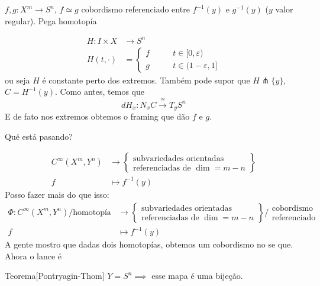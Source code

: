 \(f,g: X^m \to S^n\), \(f \simeq g\) cobordismo referenciado entre \(f^{-1}(y)\) e \(g^{-1}(y)\) (\(y\) valor regular). Pega homotopía

 \begin{align*}
	H: I\times X &\longrightarrow S^n \\
	H(t,\cdot ) &=\begin{cases}
		f\qquad & t \in [0, \varepsilon) \\
		g\qquad &t \in (1-\varepsilon,1]
	\end{cases}
\end{align*}
ou seja \(H\) é constante perto dos extremos. Também pode supor que \(H \pitchfork  \{ y\}\), \(C=H^{-1}(y)\). Como antes, temos que
\[d H_x: N_x C \xrightarrow{\cong}T_yS^n\]
E de fato nos extremos obtemos o framing que dão \(f\) e \(g\).

Qué está pasando?

\begin{align*}
	 C^\infty(X^m,Y^n) &\longrightarrow \left\{\substack{\text{subvariedades orientadas}  \\ \text{referenciadas de \(\dim=m-n\)} } \right\} \\
	f &\longmapsto f^{-1}(y)
\end{align*}
Posso fazer mais do que isso:
\begin{align*}
	\Phi: C^\infty(X^m,Y^n)\Big/\text{homotopía}  &\longrightarrow \left\{\substack{\text{subvariedades orientadas}  \\ \text{referenciadas de \(\dim=m-n\)} } \right\}\Big/\substack{\text{cobordismo}  \\ \text{referenciado} }  \\
	f &\longmapsto f^{-1}(y)
\end{align*}
A gente mostro que dadas dois homotopías, obtemos um cobordismo no se que. Ahora o lance é
\begin{thing6}{Teorema}[Pontryagin-Thom]\leavevmode
\(Y=S^n \implies \) esse mapa é uma bijeção.
\end{thing6}

